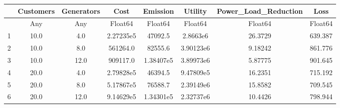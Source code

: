 \begin{tabular}{r|ccccccc}
	& Customers & Generators & Cost & Emission & Utility & Power\_Load\_Reduction & Loss\\
	\hline
	& Any & Any & Float64 & Float64 & Float64 & Float64 & Float64\\
	\hline
	1 & 10.0 & 4.0 & 2.27235e5 & 47092.5 & 2.8663e6 & 26.3729 & 639.387 \\
	2 & 10.0 & 8.0 & 561264.0 & 82555.6 & 3.90123e6 & 9.18242 & 861.776 \\
	3 & 10.0 & 12.0 & 909117.0 & 1.38407e5 & 3.89973e6 & 5.87775 & 901.645 \\
	4 & 20.0 & 4.0 & 2.79828e5 & 46394.5 & 9.47809e5 & 16.2351 & 715.192 \\
	5 & 20.0 & 8.0 & 5.17867e5 & 76588.7 & 2.39149e6 & 15.8582 & 709.545 \\
	6 & 20.0 & 12.0 & 9.14629e5 & 1.34301e5 & 2.32737e6 & 10.4426 & 798.944 \\
\end{tabular}
       